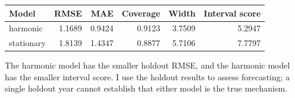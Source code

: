 \begin{center}\begin{tabular}{lrrrrr}
Model & RMSE & MAE & Coverage & Width & Interval score\\\hline
harmonic & 1.1689 & 0.9424 & 0.9123 & 3.7509 & 5.2947\\
stationary & 1.8139 & 1.4347 & 0.8877 & 5.7106 & 7.7797\\
\end{tabular}\end{center}
The harmonic model has the smaller holdout RMSE, and the harmonic model has the smaller interval score. 
I use the holdout results to assess forecasting; a single holdout year cannot establish that either model is the true mechanism.